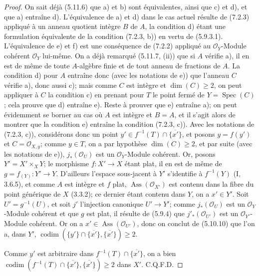 \begin{proof}
On sait déjà (5.11.6) que a) et b) sont équivalentes, ainsi que c) et d),
et que a) entraîne d). L'équivalence de a) et d) dans le cas actuel résulte
de (7.2.3) appliqué à un anneau quotient intègre $B$ de $A$, la condition
d) étant une formulation équivalente de la condition (7.2.3, b)) en vertu
de (5.9.3.1). L'équivalence de e) et f) est une conséquence de (7.2.2)
appliqué au $\mathscr O_Y$-Module cohérent $\mathscr O_Y$ lui-même. On a
déjà remarqué (5.11.7, (ii)) que si $A$ vérifie a), il en est de même de
toute $A$-algèbre finie et de tout anneau de fractions de $A$. La condition
d) pour $A$ entraîne donc (avec les notations de e)) que l'anneau $C$
vérifie a), donc aussi c); mais comme $C$ est intègre et $\dim(C)\geqslant
2$, on peut appliquer à $C$ la condition c) en prenant pour $T$ le point
fermé de $Y=\operatorname{Spec}(C)$; cela prouve que d) entraîne e). Reste
à prouver que e) entraîne a); on peut évidemment se borner au cas où $A$
est intègre et $B=A$, et il s'agit alors de montrer que la condition e)
entraîne la condition (7.2.3, c)). Avec les notations de (7.2.3, c)),
considérons donc un point
$y'\in f^{-1}(T)\cap\overline{\{x'\}}$, et posons $y=f(y')$ et
$C=\mathscr O_{X,y}$; comme $y\in T$, on a par hypothèse
$\dim(C)\geqslant2$, et par suite (avec les notations de e)),
$j_*(\mathscr O_U)$ est un $\mathscr O_Y$-Module cohérent. Or, posons
$Y'=X'\times_XY$; le morphisme $f:X'\to X$ étant plat, il en est de même de
$g=f_{(Y)}:Y'\to Y$. D'ailleurs l'espace sous-jacent à $Y'$ s'identifie à
$f^{-1}(Y)$ (I, 3.6.5), et comme $A$ est intègre et $f$ plat,
$\operatorname{Ass}(\mathscr O_{X'})$ est contenu dans la fibre du point
générique de $X$ (3.3.2); ce dernier étant contenu dans $Y$, on a
$x'\in Y'$. Soit $U'=g^{-1}(U)$, et soit $j'$ l'injection canonique
$U'\to Y'$; comme $j_*(\mathscr O_U)$ est un $\mathscr O_Y$-Module
cohérent et que $g$ est plat, il résulte de (5.9.4) que
$j'_*(\mathscr O_{U'})$ est un $\mathscr O_{Y'}$-Module cohérent. Or on a
$x'\in\operatorname{Ass}(\mathscr O_{U'})$, donc on conclut de (5.10.10)
que l'on a, dans $Y'$,
$\operatorname{codim}(\{y'\}\cap\overline{\{x'\}},
\overline{\{x'\}})\geqslant2$.


Comme $y'$ est arbitraire dans
$f^{-1}(T)\cap\overline{\{x'\}}$, on a bien
$\operatorname{codim}(f^{-1}(T)\cap\overline{\{x'\}},
\overline{\{x'\}})\geqslant2$ dans $X'$. C.Q.F.D.
\end{proof}

